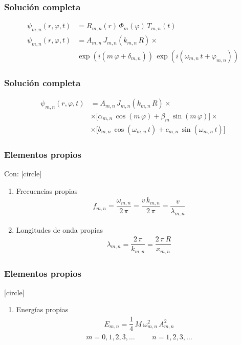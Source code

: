 \begin{frame}
\frametitle{Solución completa}
\begin{align*}
\psi_{m,n} (r ,\varphi, t) &= R_{m,n} (r) \, \Phi_{m} (\varphi) \, T_{m,n} (t) \\[0.5em]
\psi_{m,n} (r ,\varphi, t) &= A_{m,n} \, J_{m,n} (k_{m,n} \, R) \times \\[0.5em]
&\exp(i(m \, \varphi + \delta_{m,n})) \, \exp(i(\omega_{m,n} \, t + \varphi_{m,n}))
\end{align*}   
\end{frame}
\begin{frame}
\frametitle{Solución completa}
\begin{align*}
\psi_{m,n} (r ,\varphi, t) &= A_{m,n} \, J_{m,n} (k_{m,n} \, R) \times \\[0.5em]
&\times \big[ \alpha_{m,n} \,  \cos (m \, \varphi) + \beta_{m} \, \sin (m \, \varphi) \big] \times \\[0.5em]
&\times \big[ b_{m,n} \,  \cos (\omega_{m,n} \, t) + c_{m,n} \, \sin (\omega_{m,n} \, t) \big]
\end{align*}   
\end{frame}
\begin{frame}
\frametitle{Elementos propios}
Con:
[circle]
\begin{enumerate}[<+->]
\item Frecuencias propias
\begin{align*}
f_{m,n} = \dfrac{\omega_{m,n}}{2 \, \pi} = \dfrac{v \, k_{m,n}}{2 \, \pi} = \dfrac{v}{\lambda_{m,n}}
\end{align*}
\item Longitudes de onda propias
\begin{align*}
\lambda_{m,n} = \dfrac{2 \, \pi}{k_{m,n}} = \dfrac{2 \, \pi \, R}{x_{m,n}}
\end{align*}
\seti
\end{enumerate}
\end{frame}
\begin{frame}
\frametitle{Elementos propios}
[circle]
\begin{enumerate}
\conti    
\item Energías propias
\begin{align*}
E_{m,n} = \dfrac{1}{4} \, M \, \omega_{m,n}^{2} \, A_{m,n}^{2}
\end{align*}
\begin{align*}
m = 0, 1, 2, 3, \ldots \hspace{1cm} n = 1, 2, 3, \ldots
\end{align*}
\end{enumerate}
\end{frame}
